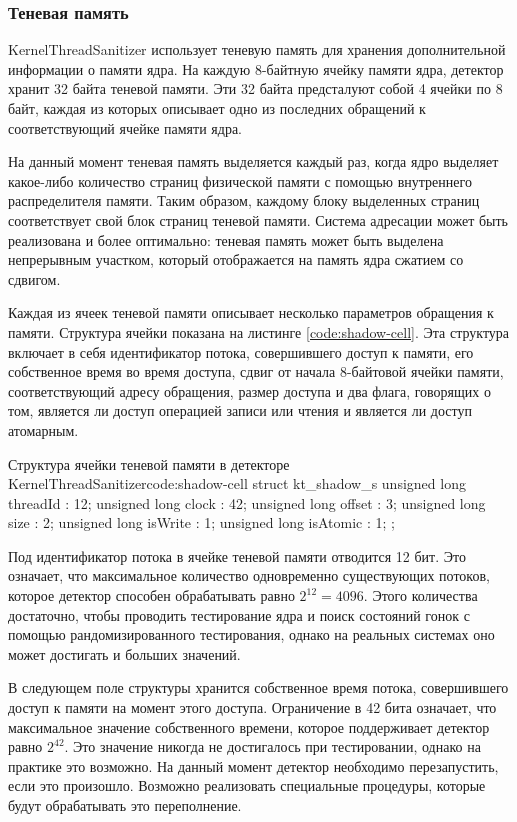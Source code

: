 \subsubsection{Теневая память}

KernelThreadSanitizer использует теневую память для хранения дополнительной информации о памяти ядра.
На каждую 8-байтную ячейку памяти ядра, детектор хранит 32 байта теневой памяти.
Эти 32 байта предсталуют собой 4 ячейки по 8 байт, каждая из которых описывает одно из последних обращений к соответствующий ячейке памяти ядра.

На данный момент теневая память выделяется каждый раз, когда ядро выделяет какое-либо количество страниц физической памяти с помощью внутреннего распределителя памяти.
Таким образом, каждому блоку выделенных страниц соответствует свой блок страниц теневой памяти.
Система адресации может быть реализована и более оптимально: теневая память может быть выделена непрерывным участком, который отображается на память ядра сжатием со сдвигом.

Каждая из ячеек теневой памяти описывает несколько параметров обращения к памяти.
Структура ячейки показана на листинге \ref{code:shadow-cell}.
Эта структура включает в себя идентификатор потока, совершившего доступ к памяти, его собственное время во время доступа, сдвиг от начала 8-байтовой ячейки памяти, соответствующий адресу обращения, размер доступа и два флага, говорящих о том, является ли доступ операцией записи или чтения и является ли доступ атомарным.

\begin{listing}{Структура ячейки теневой памяти в детекторе KernelThreadSanitizer}{code:shadow-cell}
struct kt_shadow_s {
  unsigned long threadId : 12;
  unsigned long clock    : 42;
  unsigned long offset   : 3;
  unsigned long size     : 2;
  unsigned long isWrite  : 1;
  unsigned long isAtomic : 1;
};
\end{listing}

Под идентификатор потока в ячейке теневой памяти отводится 12 бит.
Это означает, что максимальное количество одновременно существующих потоков, которое детектор способен обрабатывать равно $2^{12} = 4096$.
Этого количества достаточно, чтобы проводить тестирование ядра и поиск состояний гонок с помощью рандомизированного тестирования, однако на реальных системах оно может достигать и больших значений.

В следующем поле структуры хранится собственное время потока, совершившего доступ к памяти на момент этого доступа.
Ограничение в 42 бита означает, что максимальное значение собственного времени, которое поддерживает детектор равно $2^{42}$.
Это значение никогда не достигалось при тестировании, однако на практике это возможно.
На данный момент детектор необходимо перезапустить, если это произошло.
Возможно реализовать специальные процедуры, которые будут обрабатывать это переполнение.

